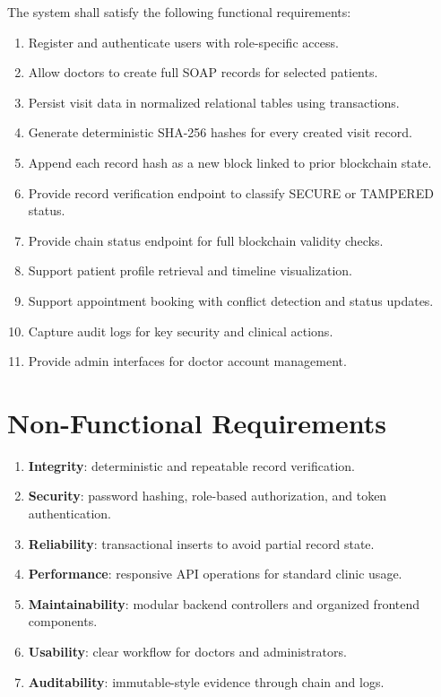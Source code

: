 \documentclass[12pt,a4paper]{report}
\begin{document}
The system shall satisfy the following functional requirements:

\begin{enumerate}
\item Register and authenticate users with role-specific access.
\item Allow doctors to create full SOAP records for selected patients.
\item Persist visit data in normalized relational tables using transactions.
\item Generate deterministic SHA-256 hashes for every created visit record.
\item Append each record hash as a new block linked to prior blockchain state.
\item Provide record verification endpoint to classify SECURE or TAMPERED status.
\item Provide chain status endpoint for full blockchain validity checks.
\item Support patient profile retrieval and timeline visualization.
\item Support appointment booking with conflict detection and status updates.
\item Capture audit logs for key security and clinical actions.
\item Provide admin interfaces for doctor account management.
\end{enumerate}

\section{Non-Functional Requirements}

\begin{enumerate}
\item \textbf{Integrity}: deterministic and repeatable record verification.
\item \textbf{Security}: password hashing, role-based authorization, and token authentication.
\item \textbf{Reliability}: transactional inserts to avoid partial record state.
\item \textbf{Performance}: responsive API operations for standard clinic usage.
\item \textbf{Maintainability}: modular backend controllers and organized frontend components.
\item \textbf{Usability}: clear workflow for doctors and administrators.
\item \textbf{Auditability}: immutable-style evidence through chain and logs.
\end{enumerate}
\end{document}
